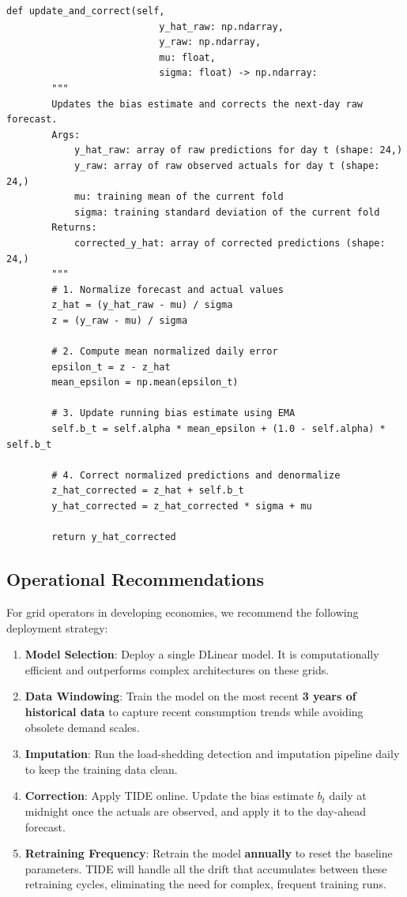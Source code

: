 \documentclass[journal]{IEEEtran}
\begin{document}
\begin{table}[t]
\begin{lstlisting}[caption={TIDE Python implementation}, label={lst:python_tide}]
    def update_and_correct(self, 
                           y_hat_raw: np.ndarray, 
                           y_raw: np.ndarray, 
                           mu: float, 
                           sigma: float) -> np.ndarray:
        """
        Updates the bias estimate and corrects the next-day raw forecast.
        Args:
            y_hat_raw: array of raw predictions for day t (shape: 24,)
            y_raw: array of raw observed actuals for day t (shape: 24,)
            mu: training mean of the current fold
            sigma: training standard deviation of the current fold
        Returns:
            corrected_y_hat: array of corrected predictions (shape: 24,)
        """
        # 1. Normalize forecast and actual values
        z_hat = (y_hat_raw - mu) / sigma
        z = (y_raw - mu) / sigma
        
        # 2. Compute mean normalized daily error
        epsilon_t = z - z_hat
        mean_epsilon = np.mean(epsilon_t)
        
        # 3. Update running bias estimate using EMA
        self.b_t = self.alpha * mean_epsilon + (1.0 - self.alpha) * self.b_t
        
        # 4. Correct normalized predictions and denormalize
        z_hat_corrected = z_hat + self.b_t
        y_hat_corrected = z_hat_corrected * sigma + mu
        
        return y_hat_corrected
\end{lstlisting}

\subsection{Operational Recommendations}
For grid operators in developing economies, we recommend the following deployment strategy:
\begin{enumerate}
    \item \textbf{Model Selection}: Deploy a single DLinear model. It is computationally efficient and outperforms complex architectures on these grids.
    \item \textbf{Data Windowing}: Train the model on the most recent \textbf{3 years of historical data} to capture recent consumption trends while avoiding obsolete demand scales.
    \item \textbf{Imputation}: Run the load-shedding detection and imputation pipeline daily to keep the training data clean.
    \item \textbf{Correction}: Apply TIDE online. Update the bias estimate $b_t$ daily at midnight once the actuals are observed, and apply it to the day-ahead forecast.
    \item \textbf{Retraining Frequency}: Retrain the model \textbf{annually} to reset the baseline parameters. TIDE will handle all the drift that accumulates between these retraining cycles, eliminating the need for complex, frequent training runs.
\end{enumerate}


\end{table}
\end{document}
